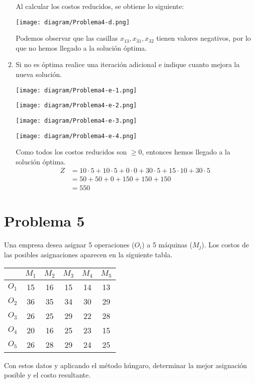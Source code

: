 \documentclass{templateNote}
\begin{document}
\begin{enumerate}
    Al calcular los costos reducidos, se obtiene lo siguiente:
    \begin{center}
        \texttt{[image: diagram/Problema4-d.png]}
    \end{center}

    Podemos observar que las casillas $x_{13}, x_{31}, x_{32}$ tienen valores negativos, por lo que no hemos llegado a la soluci\'on \'optima.

    \item Si no es \'optima realice una iteraci\'on adicional e indique cuanto mejora la nueva soluci\'on.
    \begin{center}
        \texttt{[image: diagram/Problema4-e-1.png]}
    \end{center}
    \begin{center}
        \texttt{[image: diagram/Problema4-e-2.png]}
    \end{center}
    \begin{center}
        \texttt{[image: diagram/Problema4-e-3.png]}
    \end{center}
    \begin{center}
        \texttt{[image: diagram/Problema4-e-4.png]}
    \end{center}

    Como todos los costos reducidos son $\geq 0$, entonces hemos llegado a la soluci\'on \'optima.
    \begin{align*}
        Z &= 10 \cdot 5 + 10 \cdot 5 + 0 \cdot 0 + 30 \cdot 5 + 15 \cdot 10 + 30 \cdot 5 \\
        &= 50 + 50 + 0 + 150 + 150 + 150 \\
        &= 550
    \end{align*}
\end{enumerate}

\newpage
\section*{Problema 5}
Una empresa desea asignar 5 operaciones ($O_i$) a 5 m\'aquinas ($M_j$). Los costos de las posibles asignaciones aparecen en la siguiente tabla.
\begin{center}
    \begin{tabular}{|c|ccccc|}
        \hline
        & $M_1$ & $M_2$ & $M_3$ & $M_4$ & $M_5$ \\ \hline
        $O_1$ & 15 & 16 & 15 & 14 & 13 \\
        $O_2$ & 36 & 35 & 34 & 30 & 29 \\
        $O_3$ & 26 & 25 & 29 & 22 & 28 \\
        $O_4$ & 20 & 16 & 25 & 23 & 15 \\
        $O_5$ & 26 & 28 & 29 & 24 & 25 \\ \hline
    \end{tabular}
\end{center}

Con estos datos y aplicando el m\'etodo h\'ungaro, determinar la mejor asignaci\'on posible y el costo resultante.
\end{document}
